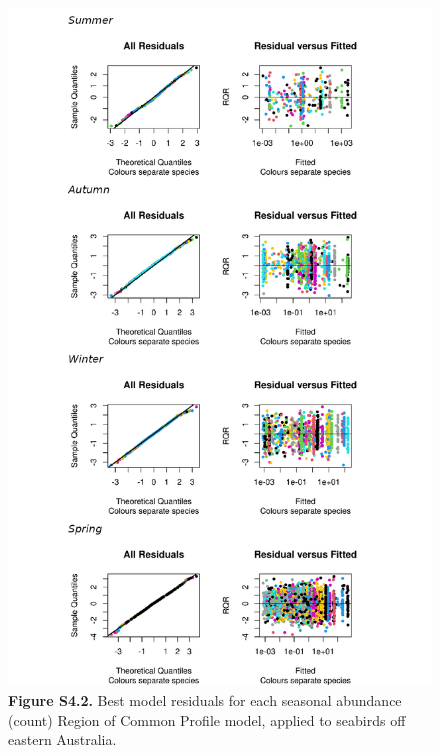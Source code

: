 \documentclass[
]{article}
\begin{document}
\begin{figure}
\centering
\includegraphics{../results/FigS4_2_best-model-residuals-NegBin.png}
\caption{\textbf{Figure S4.2.} Best model residuals for each seasonal
abundance (count) Region of Common Profile model, applied to seabirds
off eastern Australia.}
\end{figure}

\newpage
\end{document}
